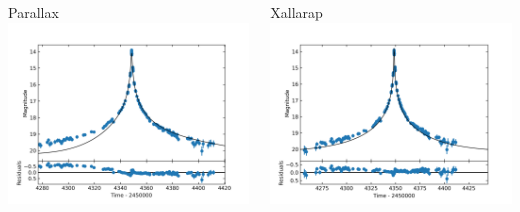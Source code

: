 \documentclass{beamer}
\begin{document}
\begin{frame}
    \centering
    \begin{columns}
        \begin{column}{0.45\linewidth}
            \centering
            Parallax
            \includegraphics[width = \textwidth]{../sim30/parallax/png/PAR-57-noaver.dat+.png}

        \end{column}
        \begin{column}{0.45\linewidth}
            \centering
            Xallarap
            \includegraphics[width = \textwidth]{../sim30/xallarap/png/PAR-57-noaver.dat.1.png}


\end{column}
\end{columns}
\end{frame}
\end{document}
